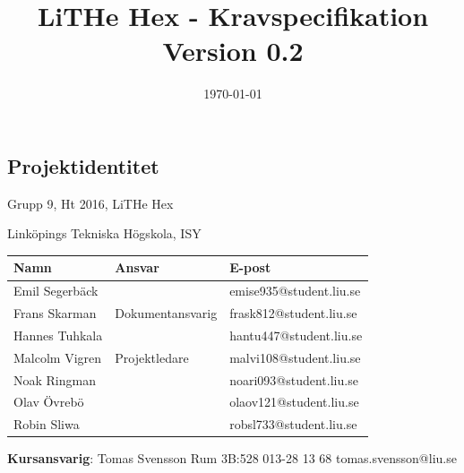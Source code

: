 \documentclass[a4paper,titlepage,12pt]{article}
\begin{document}
    \title{\textbf{LiTHe Hex - Kravspecifikation} \\
        \vspace*{0.5\baselineskip}
        Version 0.2}

    \date{\today}

	\maketitle
	\newpage

	\tableofcontents
	
	\newpage
	
	\begin{center}


		\section*{Projektidentitet}
		Grupp 9, Ht 2016, LiTHe Hex

		Linköpings Tekniska Högskola, ISY

		\begin{table}[h]
			\begin{tabular}[pos]{| l | l | l |}
				\hline
				\textbf{Namn} & \textbf{Ansvar} & \textbf{E-post} \\ \hline
				Emil Segerbäck & & emise935@student.liu.se \\ \hline
				Frans Skarman & Dokumentansvarig & frask812@student.liu.se \\ \hline
				Hannes Tuhkala & & hantu447@student.liu.se \\ \hline
				Malcolm Vigren & Projektledare & malvi108@student.liu.se \\ \hline
				Noak Ringman &  & noari093@student.liu.se \\ \hline
				Olav Övrebö &  & olaov121@student.liu.se \\ \hline
				Robin Sliwa &  & robsl733@student.liu.se \\ \hline
			\end{tabular}
		\end{table}


		\textbf{Kursansvarig}: Tomas Svensson Rum 3B:528 013-28 13 68 tomas.svensson@liu.se


		
		\newpage



\end{center}
\end{document}
